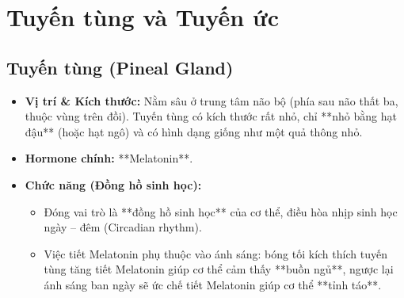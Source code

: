 \section{Tuyến tùng và Tuyến ức}

\subsection{Tuyến tùng (Pineal Gland)}
\begin{itemize}
    \item \textbf{Vị trí \& Kích thước:} Nằm sâu ở trung tâm não bộ (phía sau não thất ba, thuộc vùng trên đồi). Tuyến tùng có kích thước rất nhỏ, chỉ **nhỏ bằng hạt đậu** (hoặc hạt ngô) và có hình dạng giống như một quả thông nhỏ.
    \item \textbf{Hormone chính:} **Melatonin**.
    \item \textbf{Chức năng (Đồng hồ sinh học):}
    \begin{itemize}
        \item Đóng vai trò là **đồng hồ sinh học** của cơ thể, điều hòa nhịp sinh học ngày -- đêm (Circadian rhythm).
        \item Việc tiết Melatonin phụ thuộc vào ánh sáng: bóng tối kích thích tuyến tùng tăng tiết Melatonin giúp cơ thể cảm thấy **buồn ngủ**, ngược lại ánh sáng ban ngày sẽ ức chế tiết Melatonin giúp cơ thể **tỉnh táo**.
    \end{itemize}
\end{itemize}

